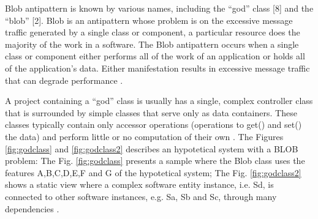 \documentclass{report}
\begin{document}

Blob antipattern is known by various names, including the “god” class [8] and the “blob” [2]. Blob is an antipattern whose problem is on the excessive message traffic generated by a single class or component, a particular resource does the majority of the work in a software. The Blob antipattern occurs when a single class or component either performs all of the work of an application or holds all of the application’s data. Either manifestation results in excessive message traffic that can degrade performance \cite{Cortellessa2007} \cite{Smith2000}.

A project containing a “god” class is usually has a single, complex controller class that is surrounded by simple classes that serve only as data containers. These classes typically contain only accessor operations (operations to get() and set() the data) and perform little or no computation of their own \cite{Smith2000}.
The  Figures \ref{fig:godclass} and \ref{fig:godclass2} describes an hypotetical system with a BLOB problem:
The Fig. \ref{fig:godclass} presents a sample where the Blob class uses the features A,B,C,D,E,F and G of the hypotetical system; The Fig. \ref{fig:godclass2}  shows a static view where  a complex software entity instance, i.e. Sd, is connected to other software instances, e.g. Sa, Sb and Sc, through many dependencies \cite{Vetoio2011}\cite{Wert2013a}.
\end{document}
